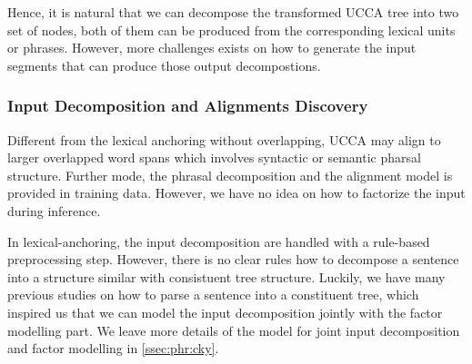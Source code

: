 Hence, it is natural that we can decompose the transformed UCCA tree
into two set of nodes, both of them can be produced from the
corresponding lexical units or phrases. However, more challenges
exists on how to generate the input segments that can produce those
output decompostions.

\subsubsection{Input Decomposition and Alignments Discovery}
\label{sssec:lex-phr:phr-input-decomposition}
Different from the lexical anchoring without overlapping, UCCA may
align to larger overlapped word spans which involves syntactic or
semantic pharsal structure. Further mode, the phrasal decomposition
and the alignment model is provided in training data. However, we have
no idea on how to factorize the input during inference.

In lexical-anchoring, the input decomposition are handled with a
rule-based preprocessing step. However, there is no clear rules how to
decompose a sentence into a structure similar with consistuent tree
structure. Luckily, we have many previous studies on how to parse a
sentence into a constituent tree, which inspired us that we can model
the input decomposition jointly with the factor modelling part. We
leave more details of the model for joint input decomposition and
factor modelling in \autoref{ssec:phr:cky}.

